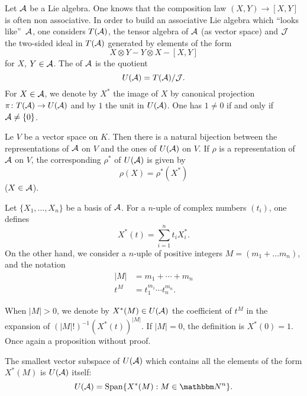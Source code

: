 Let $\mathcal{A}$ be a Lie algebra. One knows that the composition law $(X,Y)\to[X,Y]$ is often non associative. In order to build an associative Lie algebra which ``looks like''\ $\mathcal{A}$, one considers $T(\mathcal{A})$, the tensor algebra of $\mathcal{A}$ (as vector space) and $\mathcal{J}$ the two-sided ideal in $T(\mathcal{A})$ generated by elements of the form 
\[
   X\otimes Y-Y\otimes X -[X,Y]
\]
for $X$, $Y\in\mathcal{A}$. The  of $\mathcal{A}$ is the quotient  
\begin{equation}
     U(\mathcal{A})=T(\mathcal{A})/\mathcal{J}.
\end{equation}
For $X\in\mathcal{A}$, we denote by $X^*$ the image of $X$ by canonical projection $\pi\colon T(\mathcal{A})\to U(\mathcal{A})$ and by $1$ the unit in $U(\mathcal{A})$. One has $1\neq 0$ if and only if $\mathcal{A}\neq\{0\}$.

\begin{proposition}
Le $V$ be a vector space on $K$. Then there is a natural bijection between the representations of $\mathcal{A}$ on $V$ and the ones of $U(\mathcal{A})$ on $V$. If $\rho$ is a representation of $\mathcal{A}$ on $V$, the corresponding $\rho^*$ of $U(\mathcal{A})$ is given by
\[
   \rho(X)=\rho^*(X^*)
\]
($X\in\mathcal{A}$).
\end{proposition}

Let $\{X_1,\ldots,X_n\}$ be a basis of $\mathcal{A}$. For a $n$-uple of complex numbers $(t_i)$, one defines
\begin{equation}
X^*(t)=\sum_{i=1}^nt_iX^*_i.
\end{equation}
On the other hand, we consider a $n$-uple of positive integers $M=(m_1+\ldots m_n)$, and the notation 
\begin{equation}
\begin{split}
   |M|&=m_1+\cdots+m_n\\
   t^M&=t_1^{m_1}\cdots t_n^{m_n}.
\end{split}
\end{equation}

When $|M|>0$, we denote by $X^*(M)\in U(\mathcal{A})$ the coefficient of $t^M$ in the expansion of $(|M|!)^{-1} (X^*(t))^{|M|}$. If $|M|=0$, the definition is $X^*(0)=1$. Once again a proposition without proof.

\begin{proposition}
The smallest vector subspace of $U(\mathcal{A})$ which contains all the elements of the form $X^*(M)$ is $U(\mathcal{A})$ itself:
\[
   U(\mA)=\Span\{ X^*(M):M\in \eN^n \}.
\]
\end{proposition}

